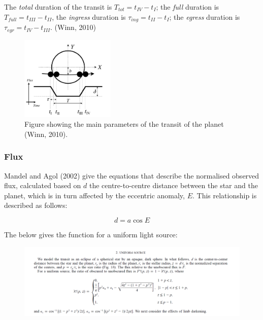 \documentclass[11pt]{article}
\begin{document}
The \emph{total} duration of the transit is
\(T_{tot} = t_{IV} - t_{I}\); the \emph{full} duration is
\(T_{full} = t_{III} - t_{II}\), the \emph{ingress} duration is
\(\tau_{ing} = t_{II} - t_{I}\); the \emph{egress} duration is
\(\tau_{egr} = t_{IV} - t_{III}\). (Winn, 2010)


\begin{figure}[!ht]
	\centering
	\includegraphics[width=0.4\textwidth]{../images/transit_flux.png}
	\caption{Figure showing the main parameters of the transit of the planet (Winn, 2010).} \label{Figure 2.d}
\end{figure}



    \hypertarget{flux}{%
\subsubsection{Flux}\label{flux}}

Mandel and Agol (2002) give the equations that describe the normalised
observed flux, calculated based on \(d\) the centre-to-centre distance
between the star and the planet, which is in turn affected by the
eccentric anomaly, \(E\). This relationship is described as follows:

\begin{equation*}
d = a\cos{E}
\end{equation*}

The below gives the function for a uniform light source:

\begin{figure}[H]
	\centering
	\includegraphics[width=\textwidth]{../images/uniform_source.png}
	\label{Figure 2.e}
\end{figure}
\end{document}
